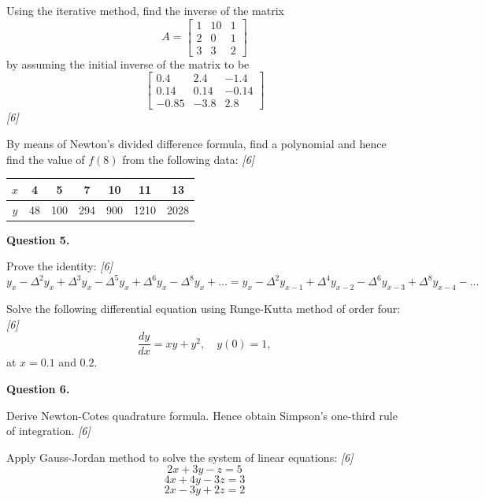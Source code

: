 \documentclass[11pt,a4paper]{article}
\newcommand{\pts}[1]{\hfill   \textit{[#1]}}
\begin{document}
\begin{parts}
  \item Using the iterative method, find the inverse of the matrix
  \[ A = 
\begin{bmatrix} 1 & 10 & 1 \\ 2 & 0 & 1 \\ 3 & 3 & 2 \end{bmatrix} \]
  by assuming the initial inverse of the matrix to be
  \[ 
\begin{bmatrix} 0.4 & 2.4 & -1.4 \\ 0.14 & 0.14 & -0.14 \\ -0.85 & -3.8 & 2.8 \end{bmatrix} \] \pts{6}
  \item By means of Newton's divided difference formula, find a polynomial and hence find the value of $f(8)$ from the following data: \pts{6}
  
\begin{center}
    
\begin{tabular}{|c|c|c|c|c|c|c|}
      \hline
      $x$ & 4 & 5 & 7 & 10 & 11 & 13 \\
      \hline
      $y$ & 48 & 100 & 294 & 900 & 1210 & 2028 \\
      \hline
    \end{tabular}
  \end{center}
\end{parts}

\medskip


\noindent   \textbf{Question 5.}

\begin{parts}
  \item Prove the identity: \pts{6}
  \[ y_x - \Delta^2 y_x + \Delta^3 y_x - \Delta^5 y_x + \Delta^6 y_x - \Delta^8 y_x + \dots = y_x - \Delta^2 y_{x-1} + \Delta^4 y_{x-2} - \Delta^6 y_{x-3} + \Delta^8 y_{x-4} - \dots \]
  \item Solve the following differential equation using Runge-Kutta method of order four: \pts{6}
  \[ \frac{dy}{dx} = xy + y^2, \quad y(0) = 1, \]
  at $x = 0.1$ and $0.2$.
\end{parts}

\medskip


\noindent   \textbf{Question 6.}

\begin{parts}
  \item Derive Newton-Cotes quadrature formula. Hence obtain Simpson's one-third rule of integration. \pts{6}
  \item Apply Gauss-Jordan method to solve the system of linear equations: \pts{6}
  \[ 2x + 3y - z = 5 \]
  \[ 4x + 4y - 3z = 3 \]
  \[ 2x - 3y + 2z = 2 \]
\end{parts}
\end{document}

